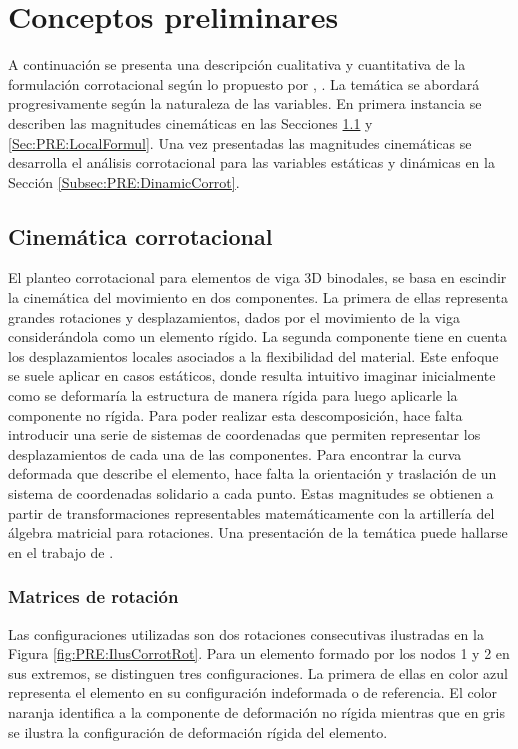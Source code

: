 \chapter{Conceptos preliminares}\label{Cap:Preliminares}
\linenumbers

A continuación se presenta una descripción cualitativa y cuantitativa de la formulación corrotacional según lo propuesto por \cite{Le2014}, \citep{Battini2002}. La temática se abordará progresivamente según la naturaleza de las variables. En primera instancia se describen las magnitudes cinemáticas en las Secciones \ref{Subsec:PRE:CienmaticCorrot} y \ref{Sec:PRE:LocalFormul}. Una vez presentadas las magnitudes cinemáticas se desarrolla el análisis corrotacional para las variables estáticas y dinámicas en la Sección \ref{Subsec:PRE:DinamicCorrot}.


\section{Cinemática corrotacional}\label{Subsec:PRE:CienmaticCorrot}


El planteo corrotacional para elementos de viga 3D binodales, se basa en escindir la cinemática del movimiento en dos componentes. La primera de ellas representa grandes rotaciones y desplazamientos, dados por el movimiento de la viga considerándola como un elemento rígido. La segunda componente tiene en cuenta los desplazamientos locales asociados a la flexibilidad del material. Este enfoque se suele aplicar en casos estáticos, donde resulta intuitivo imaginar inicialmente como se deformaría la estructura de manera rígida para luego aplicarle la componente no rígida. Para poder realizar esta descomposición, hace falta introducir una serie de sistemas de coordenadas que permiten representar los desplazamientos de cada una de las componentes. Para encontrar la curva deformada que describe el elemento, hace falta la orientación y traslación de un sistema de coordenadas solidario a cada punto. Estas magnitudes se obtienen a partir de transformaciones representables matemáticamente con la artillería del álgebra matricial para rotaciones. Una presentación de la temática puede hallarse en el trabajo de \cite{kovzar1995finite}.

\subsection{Matrices de rotación}

Las configuraciones utilizadas son dos rotaciones consecutivas ilustradas en la Figura \ref{fig:PRE:IlusCorrotRot}. Para un elemento formado por los nodos 1 y 2 en sus extremos, se distinguen tres configuraciones. La primera de ellas en color azul representa el elemento en su configuración indeformada o de referencia. El color naranja identifica a la componente de deformación no rígida mientras que en gris se ilustra la configuración de deformación rígida del elemento.

